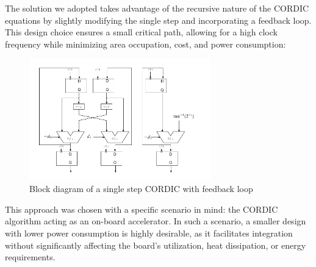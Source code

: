 The solution we adopted takes advantage of the recursive nature of the CORDIC equations by slightly modifying the single step and incorporating a feedback loop. This design choice ensures a small critical path, allowing for a high clock frequency while minimizing area occupation, cost, and power consumption:

\begin{figure}[H]
    \centering
    \includegraphics[width=0.7\textwidth]{images/Architecture/actual_CORDIC.pdf}
    \caption{Block diagram of a single step CORDIC with feedback loop}
    \label{fig:actual_CORDIC}
\end{figure}


This approach was chosen with a specific scenario in mind: the CORDIC algorithm acting as an on-board accelerator. In such a scenario, a smaller design with lower power consumption is highly desirable, as it facilitates integration without significantly affecting the board's utilization, heat dissipation, or energy requirements.

